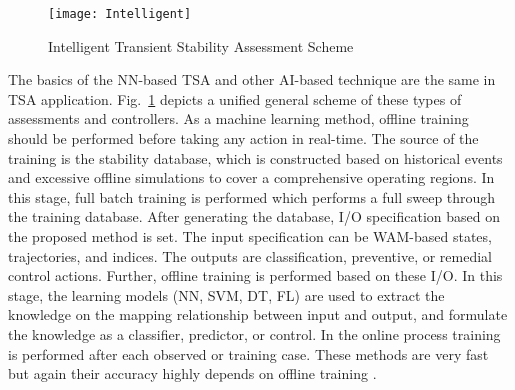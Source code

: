 \documentclass[journal]{IEEEtran}
\begin{document}
\begin{figure}
\centering
\texttt{[image: Intelligent]}
\caption{Intelligent Transient Stability Assessment Scheme}
\label{fig:TSAF}
\end{figure}


The basics of the NN-based TSA and other AI-based technique are the same in TSA application.
Fig.~\ref{fig:TSAF} depicts a unified general scheme of these types of assessments and controllers. As a machine learning method, offline training should be performed before taking any action in real-time. The source of the training is the stability database, which is constructed based on historical events and excessive offline simulations to cover a comprehensive operating regions. In this stage, full batch training is performed which performs a full sweep through the training database. After generating the database, I/O specification based on the proposed method is set. The input specification can be WAM-based states, trajectories, and indices. The outputs are classification, preventive, or remedial control actions. Further, offline training is performed based on these I/O. In this stage, the learning models (NN, SVM, DT, FL) are used to extract the knowledge on the mapping relationship between input and output, and formulate the knowledge as a classifier, predictor, or control. In the online process training is performed after each observed or training case. These methods are very fast but again their accuracy highly depends on offline training \cite{6465752}. 
\end{document}
